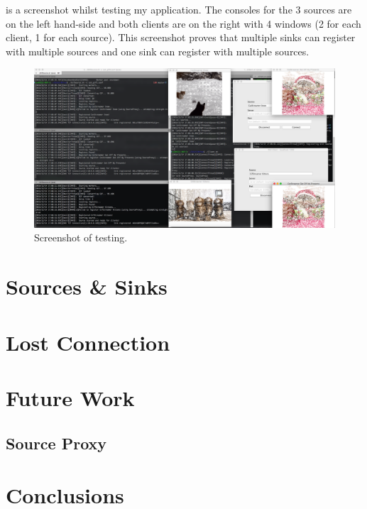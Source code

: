 \documentclass[a4paper]{article}
\begin{document}
 is a screenshot whilst testing my application.
The consoles for the 3 sources are on the left hand-side and both clients are on the right with 4 windows (2 for each client, 1 for each source).
This screenshot proves that multiple sinks can register with multiple sources and one sink can register with multiple sources.

\begin{figure}[h]
\includegraphics[width=\textwidth]{testing}
\caption{Screenshot of testing.\label{fig:testing}}
\end{figure}
\section{Sources \& Sinks}

\section{Lost Connection}

\section{Future Work}
\subsection{Source Proxy}\label{sec:source_proxy}

\section{Conclusions}
\end{document}
